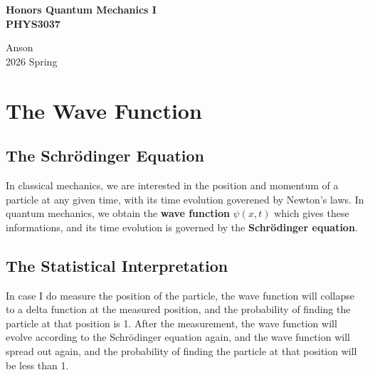 \documentclass[a4paper,12pt]{article}
\begin{document}
\begin{titlepage}
  \begin{center}

    
\textbf{\huge    Honors Quantum Mechanics I\\ PHYS3037}

    

\vspace{4cm}
Anson\\
2026 Spring    
  \end{center}
\end{titlepage}
\pagebreak

\tableofcontents
\pagebreak

\section{The Wave Function}
\subsection{The Schr\"odinger Equation}
In classical mechanics, we are interested in the position and momentum of a particle at any given time, with its time evolution goverened by Newton's laws.
In quantum mechanics, we obtain the \textbf{wave function} $\psi(x,t)$ which gives these informations, and its time evolution is governed by the \textbf{Schr\"odinger equation}.
\subsection{The Statistical Interpretation}
In case I do measure the position of the particle, the wave function will collapse to a delta function at the measured position, and the probability of finding the particle at that position is 1. After the measurement, the wave function will evolve according to the Schr\"odinger equation again, and the wave function will spread out again, and the probability of finding the particle at that position will be less than 1.
\end{document}
